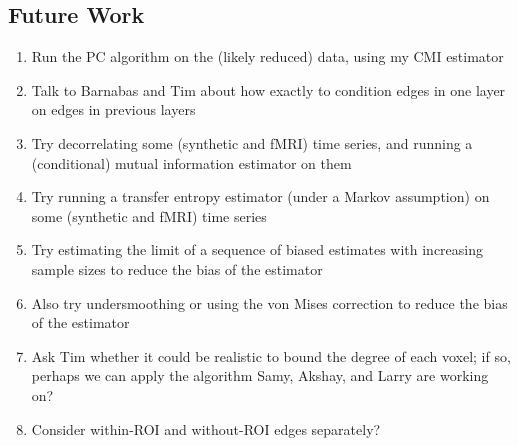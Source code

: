 \documentclass[11pt]{article}
\begin{document}
\subsection{Future Work}
\begin{enumerate}
\item Run the PC algorithm on the (likely reduced) data, using my CMI estimator
\item Talk to Barnabas and Tim about how exactly to condition edges in one
layer on edges in previous layers
\item Try decorrelating some (synthetic and fMRI) time series, and running a
(conditional) mutual information estimator on them
\item Try running a transfer entropy estimator (under a Markov assumption) on
some (synthetic and fMRI) time series
\item Try estimating the limit of a sequence of biased estimates with
increasing sample sizes to reduce the bias of the estimator
\item Also try undersmoothing or using the von Mises correction to reduce the
bias of the estimator
\item Ask Tim whether it could be realistic to bound the degree of each voxel;
if so, perhaps we can apply the algorithm Samy, Akshay, and Larry are working
on?
\item Consider within-ROI and without-ROI edges separately?
\end{enumerate}

{\small


}
\end{document}
